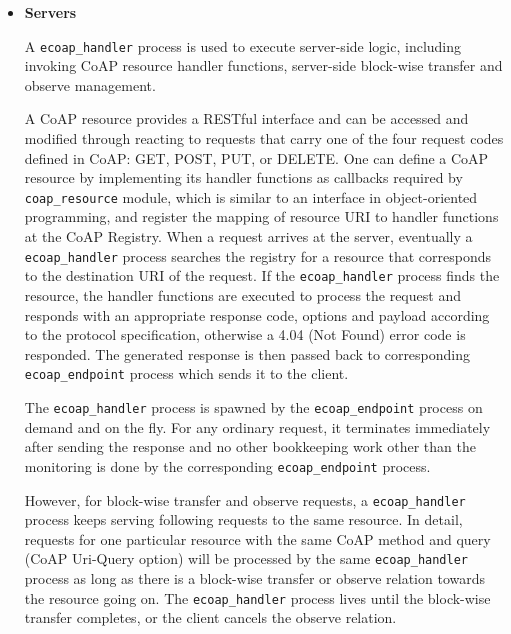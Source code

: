 \begin{itemize}

\item \textbf{Servers}

A \verb|ecoap_handler| process is used to execute server-side logic, including invoking CoAP resource handler functions, server-side block-wise transfer and observe management. 

A CoAP resource provides a RESTful interface and can be accessed and modified through reacting to requests that carry one of the four request codes defined in CoAP: GET, POST, PUT, or DELETE. One can define a CoAP resource by implementing its handler functions as callbacks required by \verb|coap_resource| module, which is similar to an interface in object-oriented programming, and register the mapping of resource URI to handler functions at the CoAP Registry. When a request arrives at the server, eventually a \verb|ecoap_handler| process searches the registry for a resource that corresponds to the destination URI of the request. If the \verb|ecoap_handler| process finds the resource, the handler functions are executed to process the request and responds with an appropriate response code, options and payload according to the protocol specification, otherwise a 4.04 (Not Found) error code is responded. The generated response is then passed back to corresponding \verb|ecoap_endpoint| process which sends it to the client. 

The \verb|ecoap_handler| process is spawned by the \verb|ecoap_endpoint| process on demand and on the fly. For any ordinary request, it terminates immediately after sending the response and no other bookkeeping work other than the monitoring is done by the corresponding \verb|ecoap_endpoint| process. 

However, for block-wise transfer and observe requests, a \verb|ecoap_handler| process keeps serving following requests to the same resource. In detail, requests for one particular resource with the same CoAP method and query (CoAP Uri-Query option) will be processed by the same \verb|ecoap_handler| process as long as there is a block-wise transfer or observe relation towards the resource going on. The \verb|ecoap_handler| process lives until the block-wise transfer completes, or the client cancels the observe relation. 


\end{itemize}
